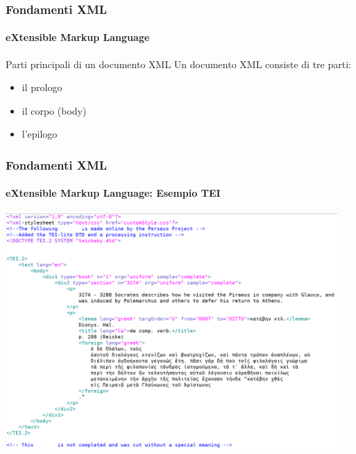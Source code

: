 \begin{frame}
	\frametitle{Fondamenti XML}
	\framesubtitle{eXtensible Markup Language}
	\addtocounter{nframe}{1}

	\begin{block}{Parti principali di un documento XML}
		Un documento XML consiste di tre parti:
		\begin{itemize}
			\item il prologo
			\item il corpo (body)
			\item l'epilogo
		\end{itemize}
	\end{block}

\end{frame}


\begin{frame}
	\frametitle{Fondamenti XML}
	\framesubtitle{eXtensible Markup Language: Esempio TEI}
	\addtocounter{nframe}{1}

	\begin{center}
		\includegraphics[width=0.95\textwidth]{imgs/xml-TEI-PerseusExample.png}
	\end{center}

\end{frame}


